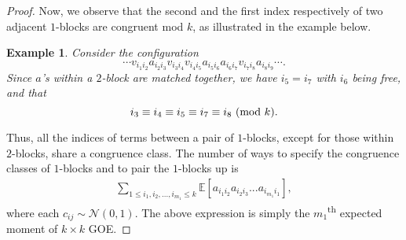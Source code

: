 \documentclass[11pt,reqno]{amsart}
\numberwithin{equation}{section}
\theoremstyle{plain}
\newtheorem{example}[thm]{Example}
\begin{document}
\begin{proof}
Now, we observe that the second and the first index respectively of two adjacent $1$-blocks are congruent mod $k$, as illustrated in the example below.

\begin{example}
    Consider the configuration
$$\cdots v_{i_1i_2}a_{i_2i_3}v_{i_3i_4}v_{i_4i_5}a_{i_5i_6}a_{i_6i_7}v_{i_7i_8}a_{i_8i_9}\cdots.$$
Since $a$'s within a $2$-block are matched together, we have $i_5=i_7$ with $i_6$ being free, and that $$i_3 \equiv i_4 \equiv i_5 \equiv i_7 \equiv i_8 \textup{ (mod $k$)}.$$ 
\end{example}

Thus, all the indices of terms between a pair of $1$-blocks, except for those within $2$-blocks, share a congruence class.  The number of ways to specify the congruence classes of $1$-blocks and to pair the $1$-blocks up is 
\begin{align}
\sum_{1\leq i_1,i_2,...,i_{m_1}\leq k}\mathbb{E}[a_{i_1i_2}a_{i_2i_3}...a_{i_{m_1}i_1}],
\end{align}
where each $c_{ij}\sim \mathcal{N}(0,1)$. The above expression is simply the $m_1$\textsuperscript{th} expected moment of $k\times k$ GOE.



\end{proof}
\end{document}
